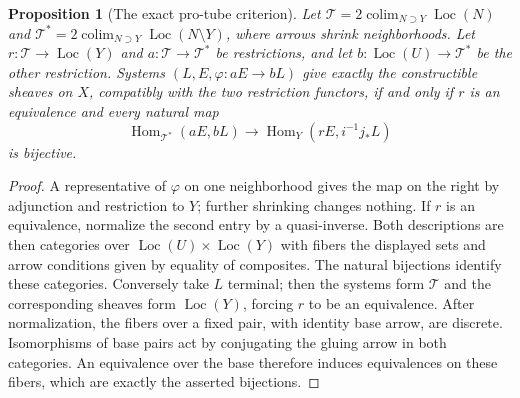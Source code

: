 \documentclass[11pt,a4paper]{article}
\newtheorem{proposition}[theorem]{Proposition}
\theoremstyle{definition}
\newcommand{\colim}{\operatorname*{colim}}
\begin{document}
\begin{proposition}[The exact pro-tube criterion]\label{prop:pro-recollement}
Let $\mathcal T=2\colim_{N\supset Y}\operatorname{Loc}(N)$ and
$\mathcal T^*=2\colim_{N\supset Y}\operatorname{Loc}(N\setminus Y)$,
where arrows shrink neighborhoods. Let
$r:\mathcal T\to\operatorname{Loc}(Y)$ and
$a:\mathcal T\to\mathcal T^*$ be restrictions, and let
$b:\operatorname{Loc}(U)\to\mathcal T^*$ be the other restriction.
Systems $(L,E,\varphi:aE\to bL)$ give exactly the constructible
sheaves on $X$, compatibly with the two restriction functors, if and
only if $r$ is an equivalence and every natural map
\[
 \operatorname{Hom}_{\mathcal T^*}(aE,bL)
 \longrightarrow\operatorname{Hom}_Y(rE,i^{-1}j_*L)
\]
is bijective.
\end{proposition}
\begin{proof}
A representative of $\varphi$ on one neighborhood gives the map on
the right by adjunction and restriction to $Y$; further shrinking
changes nothing. If $r$ is an equivalence, normalize the second
entry by a quasi-inverse. Both descriptions are then categories over
$\operatorname{Loc}(U)\times\operatorname{Loc}(Y)$ with fibers the
displayed sets and arrow conditions given by equality of composites.
The natural bijections identify these categories. Conversely take $L$
terminal; then the systems form $\mathcal T$ and the corresponding
sheaves form $\operatorname{Loc}(Y)$, forcing $r$ to be an equivalence.
After normalization, the fibers over a fixed pair, with identity
base arrow, are discrete. Isomorphisms of base pairs act by conjugating
the gluing arrow in both categories. An equivalence over the base
therefore induces equivalences on these fibers, which are exactly
the asserted bijections.
\end{proof}
\end{document}
